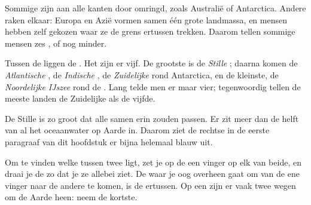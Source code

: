 \begin{remark}\label{rem:g3:continents-and-oceans:where}
Sommige  zijn aan alle kanten door  omringd, zoals Australië
of Antarctica. Andere raken elkaar: Europa en Azië vormen samen één grote
landmassa, en mensen hebben zelf gekozen waar ze de grens ertussen trekken.
Daarom tellen sommige mensen zes , of nog minder.
\end{remark}

Tussen de  liggen de . Het zijn er vijf. De grootste is
de \emph{Stille }; daarna komen de \emph{Atlantische }, de
\emph{Indische }, de \emph{Zuidelijke } rond Antarctica, en de
kleinste, de \emph{Noordelijke IJszee} rond de . Lang telde men er
maar vier; tegenwoordig tellen de meeste landen de Zuidelijke  als de
vijfde.

\begin{example}\label{ex:g3:continents-and-oceans:pacific}
De Stille  is zo groot dat alle  samen erin zouden passen.
Er zit meer dan de helft van al het oceaanwater op Aarde in. Daarom ziet de
rechtse  in de eerste paragraaf van dit hoofdstuk er bijna helemaal
blauw uit.
\end{example}

\begin{method}\label{met:g3:continents-and-oceans:between}
Om te vinden welke  tussen twee  ligt, zet je op de 
een vinger op elk van beide, en draai je de  zo dat je ze allebei ziet.
De  waar je oog overheen gaat om van de ene vinger naar de andere te
komen, is de  ertussen. Op een  zijn er vaak twee wegen om de
Aarde heen: neem de kortste.
\end{method}

